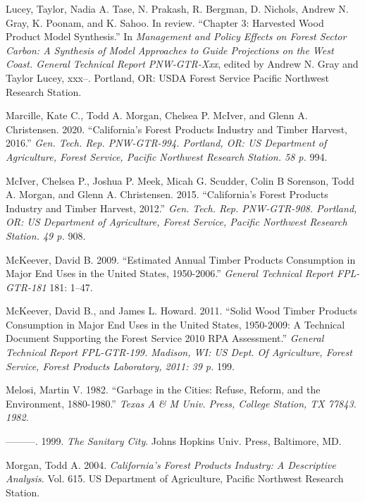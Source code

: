 \documentclass[
  openany]{book}
\newlength{\cslhangindent}
\newlength{\cslentryspacingunit} %
\newenvironment{CSLReferences}[2] %
 {%
  \setlength{\parindent}{0pt}
  \ifodd #1
  \let\oldpar\par
  \def\par{\hangindent=\cslhangindent\oldpar}
  \fi
  \setlength{\parskip}{#2\cslentryspacingunit}
 }%
 {}
\begin{document}
\begin{CSLReferences}{1}{0}
\leavevmode{}%
Lucey, Taylor, Nadia A. Tase, N. Prakash, R. Bergman, D. Nichols, Andrew
N. Gray, K. Poonam, and K. Sahoo. In review. {``Chapter 3: Harvested
Wood Product Model Synthesis.''} In \emph{Management and Policy Effects
on Forest Sector Carbon: A Synthesis of Model Approaches to Guide
Projections on the West Coast. General Technical Report PNW-GTR-Xxx},
edited by Andrew N. Gray and Taylor Lucey, xxx--. Portland, OR: USDA
Forest Service Pacific Northwest Research Station.

\leavevmode{}%
Marcille, Kate C., Todd A. Morgan, Chelsea P. McIver, and Glenn A.
Christensen. 2020. {``California's Forest Products Industry and Timber
Harvest, 2016.''} \emph{Gen. Tech. Rep. PNW-GTR-994. Portland, OR: US
Department of Agriculture, Forest Service, Pacific Northwest Research
Station. 58 p.} 994.

\leavevmode{}%
McIver, Chelsea P., Joshua P. Meek, Micah G. Scudder, Colin B Sorenson,
Todd A. Morgan, and Glenn A. Christensen. 2015. {``California's Forest
Products Industry and Timber Harvest, 2012.''} \emph{Gen. Tech. Rep.
PNW-GTR-908. Portland, OR: US Department of Agriculture, Forest Service,
Pacific Northwest Research Station. 49 p.} 908.

\leavevmode{}%
McKeever, David B. 2009. {``Estimated Annual Timber Products Consumption
in Major End Uses in the United States, 1950-2006.''} \emph{General
Technical Report FPL-GTR-181} 181: 1--47.

\leavevmode{}%
McKeever, David B., and James L. Howard. 2011. {``Solid Wood Timber
Products Consumption in Major End Uses in the United States, 1950-2009:
A Technical Document Supporting the Forest Service 2010 RPA
Assessment.''} \emph{General Technical Report FPL-GTR-199. Madison, WI:
US Dept. Of Agriculture, Forest Service, Forest Products Laboratory,
2011: 39 p.} 199.

\leavevmode{}%
Melosi, Martin V. 1982. {``Garbage in the Cities: Refuse, Reform, and
the Environment, 1880-1980.''} \emph{Texas A \& M Univ. Press, College
Station, TX 77843. 1982.}

\leavevmode{}%
---------. 1999. \emph{The Sanitary City}. Johns Hopkins Univ. Press,
Baltimore, MD.

\leavevmode{}%
Morgan, Todd A. 2004. \emph{California's Forest Products Industry: A
Descriptive Analysis}. Vol. 615. US Department of Agriculture, Pacific
Northwest Research Station.


\end{CSLReferences}
\end{document}

